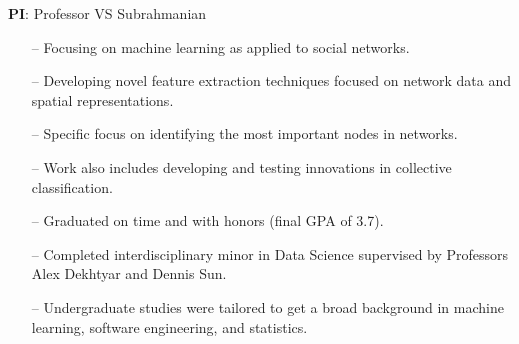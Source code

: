 
\textbf{PI}: Professor VS Subrahmanian 
\begin{itemize}
    \setlength{\itemindent}{0.5em}
    \item[--] Focusing on machine learning as applied to social networks.
    \item[--] Developing novel feature extraction techniques focused on network data and spatial representations.
        \item[--] Specific focus on identifying the most important nodes in  networks.
    \item[--] Work also includes developing and testing innovations in collective classification.
\end{itemize}
\smallskip


\begin{itemize}
    \setlength{\itemindent}{0.5em}
    \item[--] Graduated on time and with honors (final GPA of 3.7).
    \item[--] Completed interdisciplinary minor in Data Science supervised by Professors Alex Dekhtyar and Dennis Sun.
    \item[--] Undergraduate studies were tailored to get a broad background in machine learning, software engineering, and statistics.
\end{itemize}
